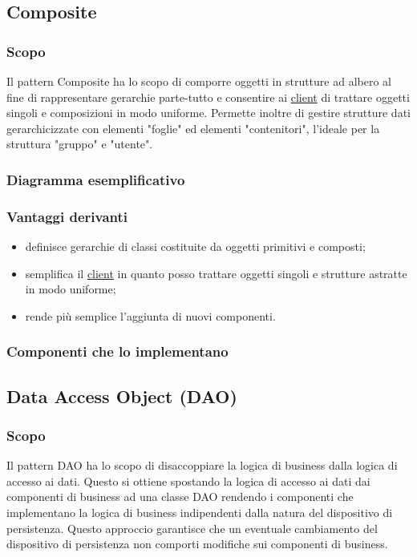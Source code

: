 \subsection{Composite}
\subsubsection{Scopo}
Il pattern Composite ha lo scopo di comporre oggetti in strutture ad albero al fine di rappresentare gerarchie parte-tutto e consentire ai \underline{client} di trattare oggetti singoli e composizioni in modo uniforme. Permette inoltre di gestire strutture dati gerarchicizzate con elementi "foglie" ed elementi "contenitori", l'ideale per la struttura "gruppo" e "utente".
\subsubsection{Diagramma esemplificativo}
\subsubsection{Vantaggi derivanti}
\begin{itemize}
\item definisce gerarchie di classi costituite da oggetti primitivi e composti;
\item semplifica il \underline{client} in quanto posso trattare oggetti singoli e strutture astratte in modo uniforme;
\item rende più semplice l'aggiunta di nuovi componenti.
\end{itemize}
\subsubsection{Componenti che lo implementano}

\subsection{Data Access Object (DAO)}
\subsubsection{Scopo}
Il pattern DAO ha lo scopo di disaccoppiare la logica di business dalla logica di accesso ai dati. Questo si ottiene spostando la logica di accesso ai dati dai componenti di business ad una classe DAO rendendo i componenti che implementano la logica di business indipendenti dalla natura del dispositivo di persistenza. Questo approccio garantisce che un eventuale cambiamento del dispositivo di persistenza non comporti modifiche sui componenti di business.
